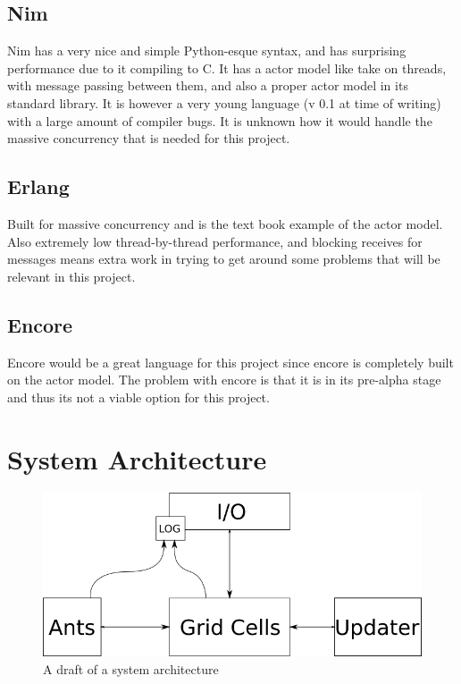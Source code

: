 \documentclass[a4paper]{article}
\begin{document}
\subsection{Nim}
Nim has a very nice and simple Python-esque syntax, and has surprising performance due to it
compiling to C. It has a actor model like take on threads, with message
passing between them, and also a proper actor model in its standard library. It is however a
very young language (v 0.1 at time of writing) with a large amount of compiler bugs. It is
unknown how it would handle the massive concurrency that is needed for this project. 

\subsection{Erlang}
Built for massive concurrency and is the text book example of the actor model. Also extremely
low thread-by-thread performance, and blocking receives for messages means extra work in
trying to get around some problems that will be relevant in this project. 

\subsection{Encore}
Encore would be a great language for this project since encore is completely
built on the actor model. The problem with encore is that it is in its pre-alpha stage and thus its not a viable option for this project.

\section{System Architecture}
\begin{figure}[h!]
\centerline{
\includegraphics[scale=0.6]{images/architecture.png} 
}
\caption{A draft of a system architecture} 
\label{fig:arch}
\end{figure}
\end{document}
